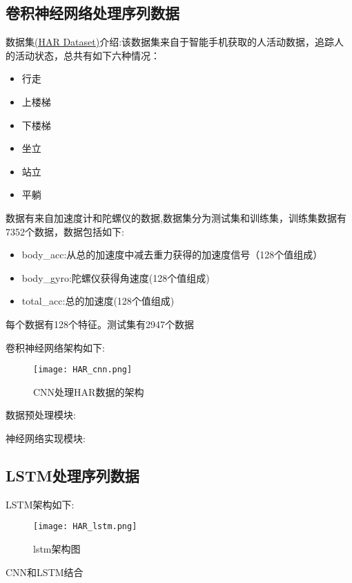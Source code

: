 \subsection{卷积神经网络处理序列数据}
数据集\href{https://archive.ics.uci.edu/ml/machine-learning-databases/00240/UCI%20HAR%20Dataset.names}{(HAR Dataset)}介绍:该数据集来自于智能手机获取的人活动数据，追踪人的活动状态，总共有如下六种情况：
\begin{itemize}
\item 行走
\item 上楼梯
\item 下楼梯
\item 坐立
\item 站立
\item 平躺
\end{itemize}
数据有来自加速度计和陀螺仪的数据,数据集分为测试集和训练集，训练集数据有7352个数据，数据包括如下:
\begin{itemize}
	\item body\_acc:从总的加速度中减去重力获得的加速度信号（128个值组成）
	\item body\_gyro:陀螺仪获得角速度(128个值组成)
	\item total\_acc:总的加速度(128个值组成)
\end{itemize}每个数据有128个特征。测试集有2947个数据

卷积神经网络架构如下:
\begin{figure}[H]
\texttt{[image: HAR\_cnn.png]}
\caption{CNN处理HAR数据的架构}
\end{figure}
数据预处理模块:

神经网络实现模块:

\subsection{LSTM处理序列数据}
LSTM架构如下:
\begin{figure}[H]
	\texttt{[image: HAR\_lstm.png]}
	\caption{lstm架构图}
\end{figure}

CNN和LSTM结合



